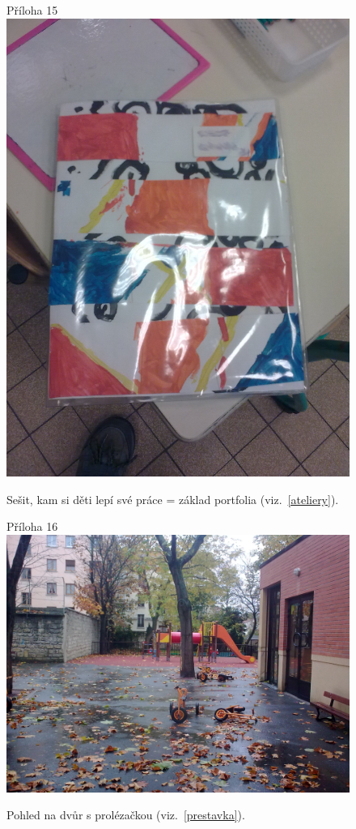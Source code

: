 	\begin{figure}[tb]
		\centering
		Příloha 15\\
		\includegraphics[height=0.35\textheight]{./fotky/Obr15.jpg}
		\caption{
			Sešit, kam si děti lepí své práce = základ portfolia (viz.~\ref{ateliery}).
		}
		\label{Obr15}
	\end{figure}

	\begin{figure}[tb]
		\centering
		Příloha 16\\
		\includegraphics[height=0.35\textheight]{./fotky/Obr16.jpg}
		\caption{
			Pohled na dvůr s prolézačkou (viz.~\ref{prestavka}).
		}
		\label{Obr16}
	\end{figure}

